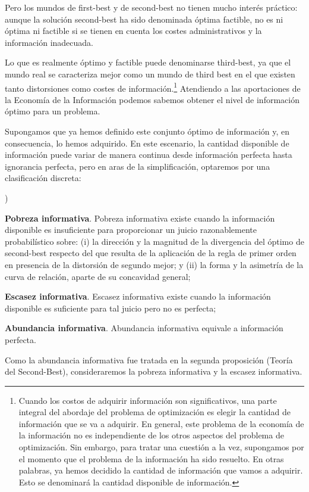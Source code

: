 \documentclass[10pt,a4paper]{article}
\newcounter{alphaitem}
\newenvironment{la}
      {\begin{list}{\alph{alphaitem})}{%
          \usecounter{alphaitem}%
          \setlength{\leftmargin}{1cm}%
          \setlength{\parskip}{3pt}%
          \setlength{\itemsep}{0pt}%
          \setlength{\parsep}{0pt}%
      }}
      {\end{list}}
\begin{document}
Pero los mundos de first-best y de second-best no tienen mucho interés práctico: aunque la solución second-best ha sido denominada óptima factible, no es ni óptima ni factible si se tienen en cuenta los costes administrativos y la información inadecuada. 

Lo que es realmente óptimo y factible puede denominarse third-best, ya que el mundo real se caracteriza mejor como un mundo de third best en el que existen tanto distorsiones como costes de información.\footnote{%
    Cuando los costos de adquirir información son significativos, una parte integral del abordaje del problema de optimización es elegir la cantidad de información que se va a adquirir. En general, este problema de la economía de la información no es independiente de los otros aspectos del problema de optimización. Sin embargo, para tratar una cuestión a la vez, supongamos por el momento que el problema de la información ha sido resuelto. En otras palabras, ya hemos decidido la cantidad de información que vamos a adquirir. Esto se denominará la cantidad disponible de información.
} Atendiendo a las aportaciones de la Economía de la Información podemos sabemos obtener el nivel de información óptimo para un problema. 

Supongamos que ya hemos definido este conjunto óptimo de información y, en consecuencia, lo hemos adquirido. En este escenario, la cantidad disponible de información puede variar de manera continua desde información perfecta hasta ignorancia perfecta, pero en aras de la simplificación, optaremos por una clasificación discreta:
\begin{la}
    \item \textbf{Pobreza informativa}. Pobreza informativa existe cuando la información disponible es insuficiente para proporcionar un juicio razonablemente probabilístico sobre: (i) la dirección y la magnitud de la divergencia del óptimo de second-best respecto del que resulta de la aplicación de la regla de primer orden en presencia de la distorsión de segundo mejor; y (ii) la forma y la asimetría de la curva de relación, aparte de su concavidad general;
    \item \textbf{Escasez informativa}. Escasez informativa existe cuando la información disponible es suficiente para tal juicio pero no es perfecta;
    \item \textbf{Abundancia informativa}. Abundancia informativa equivale a información perfecta. 
\end{la}

Como la abundancia informativa fue tratada en la segunda proposición (Teoría del Second-Best), consideraremos la pobreza informativa y la escasez informativa. 
\end{document}
